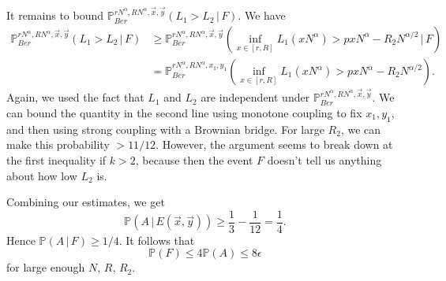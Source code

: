 \documentclass[12pt]{article}
\begin{document}
	It remains to bound $\mathbb{P}^{rN^\alpha, RN^\alpha,\vec{x},\vec{y}}_{Ber} (L_1 > L_2\,|\,F)$. We have
	\begin{align*}
	\mathbb{P}^{rN^\alpha, RN^\alpha,\vec{x},\vec{y}}_{Ber} (L_1 > L_2\,|\,F) &\geq \mathbb{P}^{rN^\alpha, RN^\alpha,\vec{x},\vec{y}}_{Ber} \left(\inf_{x\in[r,R]} L_1(xN^\alpha) > pxN^\alpha - R_2N^{\alpha/2}\,\Big|\,F\right)\\
	&= \mathbb{P}^{rN^\alpha, RN^\alpha,x_1,y_1}_{Ber} \left(\inf_{x\in[r,R]} L_1(xN^\alpha) > pxN^\alpha - R_2N^{\alpha/2}\right).
	\end{align*}
	Again, we used the fact that $L_1$ and $L_2$ are independent under $\mathbb{P}^{rN^\alpha, RN^\alpha,\vec{x},\vec{y}}_{Ber}$. We can bound the quantity in the second line using monotone coupling to fix $x_1,y_1$, and then using strong coupling with a Brownian bridge. For large $R_2$, we can make this probability $>11/12$. However, the argument seems to break down at the first inequality if $k>2$, because then the event $F$ doesn't tell us anything about how low $L_2$ is.
	
	Combining our estimates, we get
	\[
	\mathbb{P}(A\,|\,E(\vec{x},\vec{y})) \geq \frac{1}{3} - \frac{1}{12} = \frac{1}{4}.
	\]
	Hence $\mathbb{P}(A\,|\,F) \geq 1/4$. It follows that
	\[
	\mathbb{P}(F) \leq 4\mathbb{P}(A) \leq 8\epsilon
	\]
	for large enough $N$, $R$, $R_2$. 
	
\end{document}
